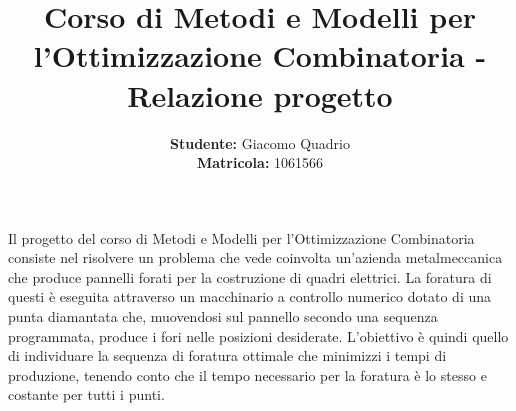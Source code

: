 \documentclass[preprint,12pt]{elsarticle}
\begin{document}
\begin{frontmatter}



\title{Corso di Metodi e Modelli per l'Ottimizzazione Combinatoria - Relazione progetto}


\address{Universit\'a degli studi di Padova \\ Anno Accademico 2015/2016}


\author{\textbf{Studente:} Giacomo Quadrio \\\textbf{Matricola:} 1061566}
\end{frontmatter}


\textbf{\abstractname{}}

Il progetto del corso di Metodi e Modelli per l'Ottimizzazione Combinatoria consiste nel risolvere un problema che vede coinvolta un'azienda metalmeccanica che produce pannelli forati per la costruzione di quadri elettrici. La foratura di questi è eseguita attraverso un macchinario a controllo numerico dotato di una punta diamantata che, muovendosi sul pannello secondo una sequenza programmata, produce i fori nelle posizioni desiderate. L'obiettivo è quindi quello di individuare la sequenza di foratura ottimale che minimizzi i tempi di produzione, tenendo conto che il tempo necessario per la foratura è lo stesso e costante per tutti i punti.


\end{document}
